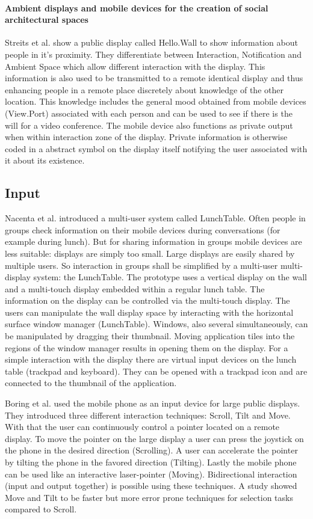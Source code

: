 \paragraph{Ambient displays and mobile devices for the creation of social architectural spaces}
Streits et al. \cite{streitz_ambient_2003} show a public display called Hello.Wall to show information about people in it's proximity.
They differentiate between Interaction, Notification and Ambient Space which allow different interaction with the display.
This information is also used to be transmitted to a remote identical display and thus enhancing people in a remote place discretely about knowledge of the other location.
This knowledge includes the general mood obtained from mobile devices (View.Port) associated with each person and can be used to see if there is the will for a video conference.
The mobile device also functions as private output when within interaction zone of the display.
Private information is otherwise coded in a abstract symbol on the display itself notifying the user associated with it about its existence.




\subsection{Input}
Nacenta et al. \cite{a18-nacenta} introduced a multi-user system called LunchTable.
Often people in groups check information on their mobile devices during conversations (for example during lunch). But for sharing information in groups mobile devices are less suitable: displays are simply too small.
Large displays are easily shared by multiple users. So interaction in groups shall be simplified by a multi-user multi-display system: the LunchTable.
The prototype uses a vertical display on the wall and a multi-touch display embedded within a regular lunch table.
The information on the display can be controlled via the multi-touch display.
The users can manipulate the wall display space by interacting with the horizontal surface window manager (LunchTable).
Windows, also several simultaneously, can be manipulated by dragging their thumbnail. Moving application tiles into the regions of the window manager results in opening them on the display.
For a simple interaction with the display there are virtual input devices on the lunch table (trackpad and keyboard).
They can be opened with a trackpad icon and are connected to the thumbnail of the application.

Boring et al. \cite{p161-boring} used the mobile phone as an input device for large public displays.
They introduced three different interaction techniques: Scroll, Tilt and Move. With that the user can continuously control a pointer located on a remote display.
To move the pointer on the large display a user can press the joystick on the phone in the desired direction (Scrolling).
A user can accelerate the pointer by tilting the phone in the favored direction (Tilting).
Lastly the mobile phone can be used like an interactive laser-pointer (Moving).
Bidirectional interaction (input and output together) is possible using these techniques.
A study showed Move and Tilt to be faster but more error prone techniques for selection tasks compared to Scroll.

